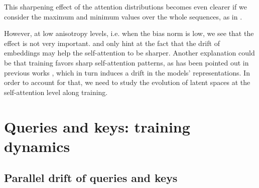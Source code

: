 This sharpening effect of the attention distributions becomes even clearer if we consider the maximum and minimum values over the whole sequences, as in .

However, at low anisotropy levels, i.e. when the bias norm is low, we see that the effect is not very important.  and  only hint at the fact that the drift of embeddings may help the self-attention to be sharper. Another explanation could be that training favors sharp self-attention patterns, as has been pointed out in previous works \citep{clark-etal-2019-bert}, which in turn induces a drift in the models' representations. In order to account for that, we need to study the evolution of latent spaces at the self-attention level along training.

\section{Queries and keys: training dynamics}
\label{sec:qk}

\subsection{Parallel drift of queries and keys}

